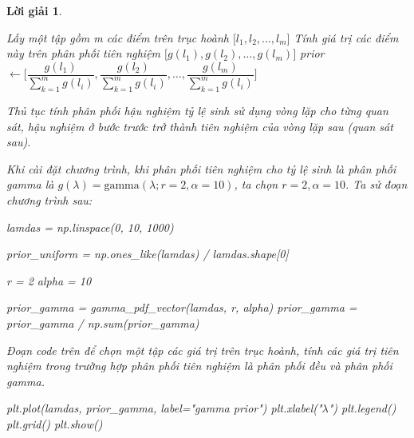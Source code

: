 \documentclass[14pt, a4paper]{article}
\theoremstyle{sltheorem}
\theoremstyle{soltheorem}
\newtheorem*{loigiai}{Lời giải}
\begin{document}
\begin{loigiai}
\begin{enumerate}
        \begin{algorithm}[h!]
            \DontPrintSemicolon
            Lấy một tập gồm m các điểm trên trục hoành $\lbrack l_1, l_2, \dots, l_m \rbrack$\;
            Tính giá trị các điểm này trên phân phối tiên nghiệm $\lbrack g(l_1), g(l_2), \dots, g(l_m) \rbrack$\;
            prior $\gets \Big \lbrack \dfrac{g(l_1)}{\sum_{k=1}^m g(l_i)}, \dfrac{g(l_2)}{\sum_{k=1}^m g(l_i)}, \dots, \dfrac{g(l_m)}{\sum_{k=1}^m g(l_i)} \Big \rbrack$\;
            \;
            \caption{Thủ tục tính phân phối hậu nghiệm tỷ lệ sinh sử dụng vòng lặp cho từng quan sát, hậu nghiệm ở bước trước trở thành tiên nghiệm của vòng lặp sau (quan sát sau).}
        \end{algorithm}

        Khi cài đặt chương trình, khi phân phối tiên nghiệm cho tỷ lệ sinh là phân phối gamma là $g(\lambda) = \text{gamma}(\lambda; r=2, \alpha=10)$, ta chọn $r=2, \alpha=10$.
        Ta sử đoạn chương trình sau:

        \begin{python}
lamdas = np.linspace(0, 10, 1000)

prior_uniform = np.ones_like(lamdas) / lamdas.shape[0]
            
r = 2
alpha = 10
            
prior_gamma = gamma_pdf_vector(lamdas, r, alpha)
prior_gamma = prior_gamma / np.sum(prior_gamma)
        \end{python}

        Đoạn code trên để chọn một tập các giá trị trên trục hoành, tính các giá trị tiên nghiệm trong trường hợp phân phối tiên nghiệm là phân phối đều và phân phối gamma.

        \begin{python}
plt.plot(lamdas, prior_gamma, label="gamma prior")
plt.xlabel("$\lambda$")
plt.legend()
plt.grid()
plt.show()
        \end{python}


\end{enumerate}
\end{loigiai}
\end{document}

